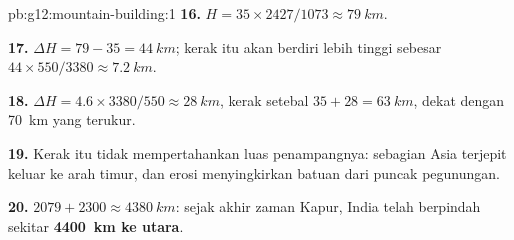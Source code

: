 \begin{solution}{pb:g12:mountain-building:1}
\textbf{16.} $H = 35 \times 2427/1073 \approx \qty{79}{km}$.

\textbf{17.} $\Delta H = 79 - 35 = \qty{44}{km}$; kerak itu akan berdiri lebih
tinggi sebesar $44 \times 550/3380 \approx \qty{7.2}{km}$.

\textbf{18.} $\Delta H = 4.6 \times 3380/550 \approx \qty{28}{km}$, kerak setebal
$35 + 28 = \qty{63}{km}$, dekat dengan \qty{70}{km} yang
terukur.

\textbf{19.} Kerak itu tidak mempertahankan luas penampangnya: sebagian Asia
terjepit keluar ke arah timur, dan erosi menyingkirkan batuan dari puncak
pegunungan.

\textbf{20.} $2079 + 2300 \approx \qty{4380}{km}$: sejak akhir zaman Kapur,
India telah berpindah sekitar \textbf{\qty{4400}{km} ke utara}.
\end{solution}
